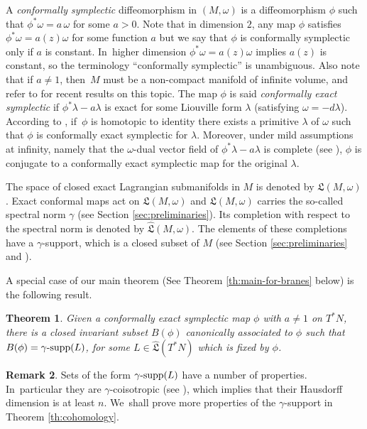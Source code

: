 \documentclass[JEP,XML,SOM,Unicode,NoFloatCountersInSection,published]{cedram}
\newtheorem{thm}{Theorem}[section]
\theoremstyle{definition}
\newtheorem{rem}[thm]{Remark}
\DeclareMathOperator{\gammasupp}{\gamma\textup{-supp}}
\newcommand{\fL}{\mathfrak {L}}
\newcommand{\hatL}{\widehat{\fL}}
\begin{document}
A \emph{conformally symplectic} diffeomorphism in $(M,\omega)$ is a diffeomorphism $\phi$ such that $\phi^*\omega=a\, \omega$ for some $a>0$. Note that in dimension $2$, any map $\phi$ satisfies $\phi^*\omega=a(z)\omega$ for some function $a$ but we say that $\phi$ is conformally symplectic only if $a$ is constant. In~higher dimension $\phi^*\omega=a(z)\omega$ implies $a(z)$ is constant, so the terminology ``conformally symplectic'' is unambiguous. Also note that if $a\neq 1$, then~$M$ must be a non-compact manifold of infinite volume, and refer to
\cite{Arnaud-Fejoz} for recent results on this topic. The map $\phi$ is said \emph{conformally exact symplectic} if $\phi^*{\lambda}-a \lambda$ is exact
for some Liouville form $\lambda$ (\ie satisfying $\omega=-d\lambda$).
According to \cite[App.\,B]{Arnaud-Fejoz}, if~$\phi$ is homotopic to identity there exists a primitive $\lambda$ of $\omega$ such that $\phi$ is conformally exact symplectic for $\lambda$. Moreover, under mild assumptions at infinity, namely that the $\omega$-dual vector field of $\phi^* \lambda-a \lambda$ is complete (see \cite[App.\,B, Prop.\,10]{Arnaud-Fejoz}), $\phi$ is conjugate to a conformally exact symplectic map for the original $\lambda$.

The space of closed exact Lagrangian submanifolds in $M$ is denoted by $\fL(M,\omega)$.
Exact conformal maps act on $\fL(M,\omega)$ and $\fL(M,\omega)$ carries the so-called spectral norm $\gamma$ (see Section \ref{sec:preliminaries}). Its completion with respect to the spectral norm is denoted by $\hatL(M,\omega)$. The elements of these completions have a $\gamma$\nobreakdash-support, which is a closed subset of $M$ (see Section \ref{sec:preliminaries} and \cite{Viterbo-gammas}).

A special case of our main theorem (See Theorem \ref{th:main-for-branes} below) is the following result.

\begin{thm}\label{th:main}
Given a conformally exact symplectic map $\phi$ with $a\neq 1$ on $T^*N$, there is a closed invariant subset $B(\phi)$ canonically associated to $\phi$ such that $B(\phi)=\gammasupp(L)$, for some $L \in \hatL(T^*N)$ which is fixed by $\phi$.
\end{thm}

\begin{rem}
Sets of the form $\gammasupp(L)$ have a number of properties. In~particular they are $\gamma$\nobreakdash-coisotropic (see \cite{Viterbo-gammas}), which implies that their Hausdorff dimension is at least $n$. We~shall prove more properties of the $\gamma$\nobreakdash-support in Theorem \ref{th:cohomology}.
\end{rem}
\end{document}
